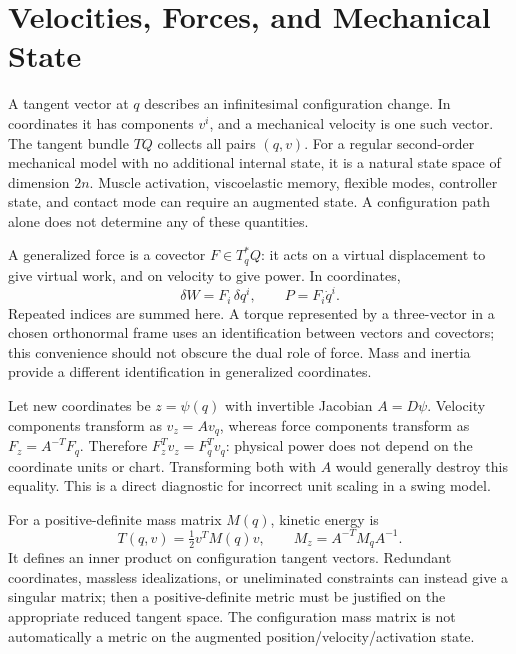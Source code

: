 \section{Velocities, Forces, and Mechanical State}

A tangent vector at $q$ describes an infinitesimal configuration change. In
coordinates it has components $v^i$, and a mechanical velocity is one such
vector. The tangent bundle $TQ$ collects all pairs $(q,v)$. For a regular
second-order mechanical model with no additional internal state, it is a
natural state space of dimension $2n$. Muscle activation, viscoelastic memory,
flexible modes, controller state, and contact mode can require an augmented
state. A configuration path alone does not determine any of these quantities.

A generalized force is a covector $F\in T_q^*Q$: it acts on a virtual
displacement to give virtual work, and on velocity to give power. In coordinates,
\begin{equation}\label{eq:manifold_force_power}
 \delta W=F_i\,\delta q^i,\qquad P=F_i\dot q^i.
\end{equation}
Repeated indices are summed here. A torque represented by a three-vector in
a chosen orthonormal frame uses an identification between vectors and
covectors; this convenience should not obscure the dual role of force.
Mass and inertia provide a different identification in generalized coordinates.

Let new coordinates be $z=\psi(q)$ with invertible Jacobian $A=D\psi$.
Velocity components transform as $v_z=A v_q$, whereas force components
transform as $F_z=A^{-T}F_q$. Therefore $F_z^Tv_z=F_q^Tv_q$: physical power
does not depend on the coordinate units or chart. Transforming both with $A$
would generally destroy this equality. This is a direct diagnostic for
incorrect unit scaling in a swing model.

For a positive-definite mass matrix $M(q)$, kinetic energy is
\begin{equation}\label{eq:manifold_kinetic_metric}
 T(q,v)=\tfrac12v^TM(q)v,\qquad
 M_z=A^{-T}M_qA^{-1}.
\end{equation}
It defines an inner product on configuration tangent vectors. Redundant
coordinates, massless idealizations, or uneliminated constraints can instead
give a singular matrix; then a positive-definite metric must be justified on
the appropriate reduced tangent space. The configuration mass matrix is not
automatically a metric on the augmented position/velocity/activation state.

